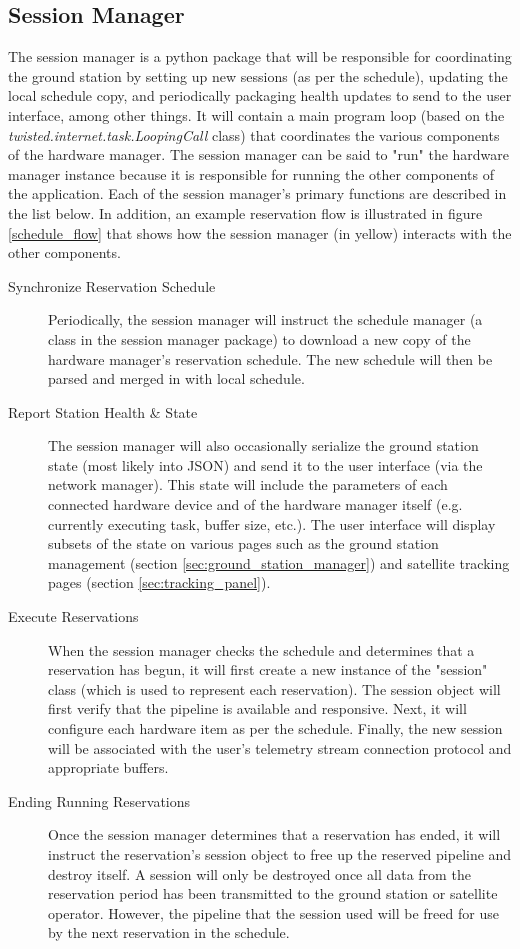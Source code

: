 \documentclass{mxl-design}
\begin{document}
\subsection{Session Manager}
\label{sec:session_manager}
The session manager is a python package that will be responsible for coordinating the ground station by setting up new sessions (as per the schedule), updating the local schedule copy, and periodically packaging health updates to send to the user interface, among other things. It will contain a main program loop (based on the \textit{twisted.internet.task.LoopingCall} class) that coordinates the various components of the hardware manager. The session manager can be said to "run" the hardware manager instance because it is responsible for running the other components of the application. Each of the session manager's primary functions are described in the list below. In addition, an example reservation flow is illustrated in figure \ref{schedule_flow} that shows how the session manager (in yellow) interacts with the other components.

\begin{description}
	\item[Synchronize Reservation Schedule] Periodically, the session manager will instruct the schedule manager (a class in the session manager package) to download a new copy of the hardware manager's reservation schedule. The new schedule will then be parsed and merged in with local schedule.
	\item[Report Station Health \& State] The session manager will also occasionally serialize the ground station state (most likely into JSON) and send it to the user interface (via the network manager). This state will include the parameters of each connected hardware device and of the hardware manager itself (e.g. currently executing task, buffer size, etc.). The user interface will display subsets of the state on various pages such as the ground station management (section \ref{sec:ground_station_manager}) and satellite tracking pages (section \ref{sec:tracking_panel}).
	\item[Execute Reservations] When the session manager checks the schedule and determines that a reservation has begun, it will first create a new instance of the "session" class (which is used to represent each reservation). The session object will first verify that the pipeline is available and responsive. Next, it will configure each hardware item as per the schedule. Finally, the new session will be associated with the user's telemetry stream connection protocol and appropriate buffers.
	\item[Ending Running Reservations] Once the session manager determines that a reservation has ended, it will instruct the reservation's session object to free up the reserved pipeline and destroy itself. A session will only be destroyed once all data from the reservation period has been transmitted to the ground station or satellite operator. However, the pipeline that the session used will be freed for use by the next reservation in the schedule.
\end{description}
\end{document}
